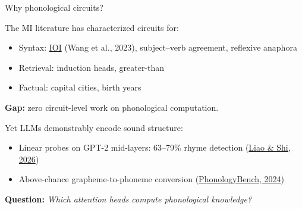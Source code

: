 \documentclass[10pt,aspectratio=169]{beamer}
\begin{document}
\begin{frame}{Why phonological circuits?}
\hypertarget{sl:motivation}{}

The MI literature has characterized circuits for:
\begin{itemize}
  \item Syntax: \href{https://arxiv.org/abs/2211.00593}{IOI} (Wang et al., 2023), subject--verb agreement, reflexive anaphora
  \item Retrieval: induction heads, greater-than
  \item Factual: capital cities, birth years
\end{itemize}

\vspace{0.8em}
\textbf{Gap:} zero circuit-level work on \alert{phonological} computation.

\vspace{0.8em}
Yet LLMs demonstrably encode sound structure:
\begin{itemize}
  \item Linear probes on GPT-2 mid-layers: 63--79\% rhyme detection (\href{https://aclanthology.org/2026.latechclfl-1.9}{Liao \& Shi, 2026})
  \item Above-chance grapheme-to-phoneme conversion (\href{https://arxiv.org/abs/2404.02456}{PhonologyBench, 2024})
\end{itemize}

\vspace{0.8em}
\textbf{Question:} \emph{Which attention heads compute phonological knowledge?}
\end{frame}
\end{document}
